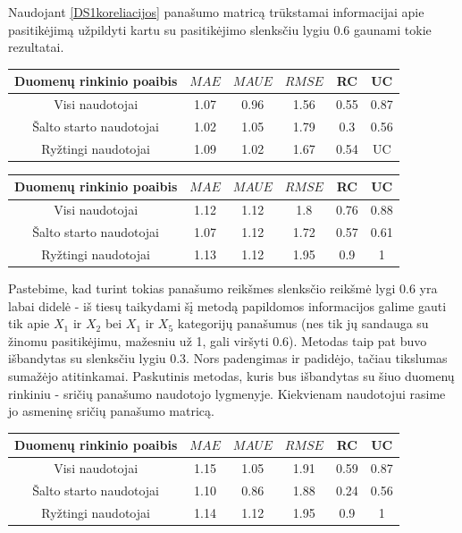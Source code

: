 \documentclass{VUMIFInfMagistrinis}
\begin{document}
\indent 
Naudojant \ref{DS1koreliacijos} panašumo matricą trūkstamai informacijai apie pasitikėjimą užpildyti kartu su pasitikėjimo slenksčiu lygiu 0.6 gaunami tokie rezultatai.
\begin{center}
	\begin{tabular}{||c c c c c c||} 
		Duomenų rinkinio poaibis & $MAE$ & $MAUE$ & $RMSE$ & RC & UC \\
		\hline
		Visi naudotojai & 1.07 & 0.96 & 1.56 & 0.55 & 0.87 \\
		\hline
		Šalto starto naudotojai & 1.02 & 1.05 & 1.79 & 0.3 & 0.56 \\
		\hline
		Ryžtingi naudotojai & 1.09 & 1.02 & 1.67 & 0.54 & UC \\
	\end{tabular}
\end{center}
\begin{center}
	\begin{tabular}{||c c c c c c||} 
		Duomenų rinkinio poaibis & $MAE$ & $MAUE$ & $RMSE$ & RC & UC \\
		\hline
		Visi naudotojai & 1.12 & 1.12 & 1.8 & 0.76 & 0.88 \\
		\hline
		Šalto starto naudotojai & 1.07 & 1.12 & 1.72 & 0.57 & 0.61 \\
		\hline
		Ryžtingi naudotojai & 1.13 & 1.12 & 1.95 & 0.9 & 1 \\
	\end{tabular}
\end{center}
Pastebime, kad turint tokias panašumo reikšmes slenksčio reikšmė lygi 0.6 yra labai didelė - iš tiesų taikydami šį metodą papildomos informacijos galime gauti tik apie $X_1$ ir $X_2$ bei $X_1$ ir $X_5$ kategorijų panašumus (nes tik jų sandauga su žinomu pasitikėjimu, mažesniu už 1, gali viršyti 0.6). Metodas taip pat buvo išbandytas su slenksčiu lygiu 0.3. Nors padengimas ir padidėjo, tačiau tikslumas sumažėjo atitinkamai. 
\newline
\indent 
Paskutinis metodas, kuris bus išbandytas su šiuo duomenų rinkiniu - sričių panašumo naudotojo lygmenyje. Kiekvienam naudotojui rasime jo asmeninę sričių panašumo matricą.
\begin{center}
	\begin{tabular}{||c c c c c c||} 
		Duomenų rinkinio poaibis & $MAE$ & $MAUE$ & $RMSE$ & RC & UC \\
		\hline
		Visi naudotojai & 1.15 & 1.05 & 1.91 & 0.59 & 0.87 \\
		\hline
		Šalto starto naudotojai & 1.10 & 0.86 & 1.88 & 0.24 & 0.56 \\
		\hline
		Ryžtingi naudotojai & 1.14 & 1.12 & 1.95 & 0.9 & 1 \\
	\end{tabular}
\end{center}
\end{document}
